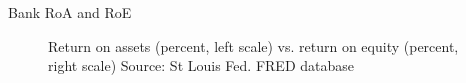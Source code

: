 
\begin{frame}{Bank RoA and RoE}

\begin{figure}
\begin{center}


\caption{\label{fig:L4_roe_and_roa} Return on assets (percent, left scale) vs. return on equity (percent, right scale) Source: St Louis Fed. FRED database}

\end{center}
\end{figure}

\end{frame}



